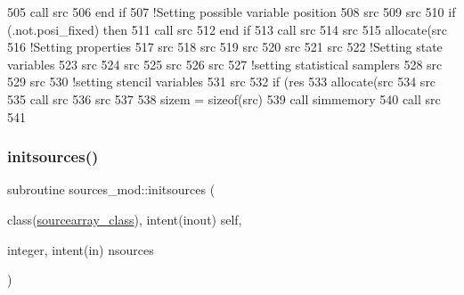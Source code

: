 \begin{DoxyCode}
505         \textcolor{keyword}{call }src%
506 \textcolor{keywordflow}{    end if}
507     \textcolor{comment}{!Setting possible variable position}
508     src%
509     src%
510     \textcolor{keywordflow}{if} (.not.posi\_fixed) \textcolor{keywordflow}{then}
511         \textcolor{keyword}{call }src%
512 \textcolor{keywordflow}{    end if}
513     \textcolor{keyword}{call }src%
514     src%
515     \textcolor{keyword}{allocate}(src%
516     \textcolor{comment}{!Setting properties}
517     src%
518     src%
519     src%
520     src%
521     src%
522     \textcolor{comment}{!Setting state variables}
523     src%
524     src%
525     src%
526     src%
527     \textcolor{comment}{!setting statistical samplers}
528     src%
529     src%
530     \textcolor{comment}{!setting stencil variables}
531     src%
532     \textcolor{keywordflow}{if} (res%
533     \textcolor{keyword}{allocate}(src%
534     src%
535     \textcolor{keyword}{call }src%
536     src%
537 
538     sizem = sizeof(src)
539     \textcolor{keyword}{call }simmemory%
540     \textcolor{keyword}{call }src%
541 
\end{DoxyCode}
\mbox{\label{namespacesources__mod_a6da3303e5c39d77c0111ec50623bf5fe}} 
\subsubsection{\texorpdfstring{initsources()}{initsources()}}
{\footnotesize\ttfamily subroutine sources\+\_\+mod\+::initsources (\begin{DoxyParamCaption}\item[{class(\mbox{\hyperlink{structsources__mod_1_1sourcearray__class}{sourcearray\+\_\+class}}), intent(inout)}]{self,  }\item[{integer, intent(in)}]{nsources }\end{DoxyParamCaption})\hspace{0.3cm}{\ttfamily [private]}}



